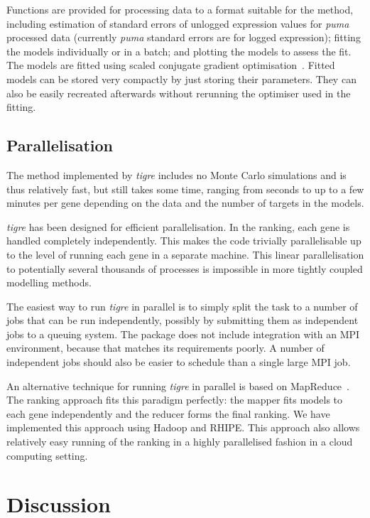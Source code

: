 \documentclass{bioinfo}
\newcommand{\tigre}{\emph{tigre}}
\begin{document}
Functions are provided for processing data to a format suitable for
the method, including estimation of standard errors of unlogged expression
values for \emph{puma} processed data (currently \emph{puma} standard errors are for logged expression); fitting the models individually
or in a batch; and plotting the models to assess the fit.  The models
are fitted using scaled conjugate gradient
optimisation~\citep{Moller:scg93}.  Fitted models can be stored very
compactly by just storing their parameters.  They can also be easily
recreated afterwards without rerunning the optimiser used in the
fitting.

\subsection{Parallelisation}

The method implemented by \tigre{} includes no Monte Carlo simulations
and is thus relatively fast, but still takes some time, ranging from
seconds to up to a few minutes per gene depending on the data and the
number of targets in the models.

\tigre{} has been designed for efficient parallelisation.  In the
ranking, each gene is handled completely independently.  This makes
the code trivially parallelisable up to the level of running each gene
in a separate machine.  This linear parallelisation to potentially
several thousands of processes is impossible in more tightly coupled
modelling methods.

The easiest way to run \tigre{} in parallel is to simply split the
task to a number of jobs that can be run independently, possibly by
submitting them as independent jobs to a queuing system.  The package
does not include integration with an MPI environment, because that
matches its requirements poorly.  A number of independent jobs should
also be easier to schedule than a single large MPI job.

An alternative technique for running \tigre{} in parallel is based on
MapReduce~\citep{Dean2008}.  The ranking approach fits this paradigm
perfectly: the mapper fits models to each gene independently and the
reducer forms the final ranking.  We have implemented this approach
using Hadoop and RHIPE.  This approach also allows relatively easy
running of the ranking in a highly parallelised fashion in a cloud
computing setting.

\section{Discussion}
\end{document}
